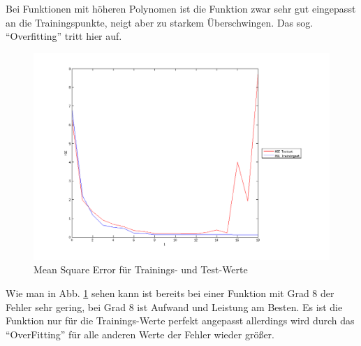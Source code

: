 Bei Funktionen mit höheren Polynomen ist die Funktion zwar sehr gut eingepasst an die Trainingspunkte, neigt aber zu starkem Überschwingen.
Das sog. ``Overfitting'' tritt hier auf.


\begin{figure}[hp!]
\begin{center}
 \includegraphics[width=1\textwidth]{./figures/1_1_1_MSE}
 \caption[Mean Square Error]{Mean Square Error für Trainings- und Test-Werte}
\label{fig:MSE}
\end{center}
\end{figure}

Wie man in Abb. \ref{fig:MSE} sehen kann ist bereits bei einer Funktion mit Grad 8 der Fehler sehr gering, bei Grad 8 ist  
Aufwand und Leistung am Besten. Es ist die Funktion nur für die Trainings-Werte 
perfekt angepasst allerdings wird durch das ``OverFitting'' für alle anderen Werte der Fehler wieder größer.
